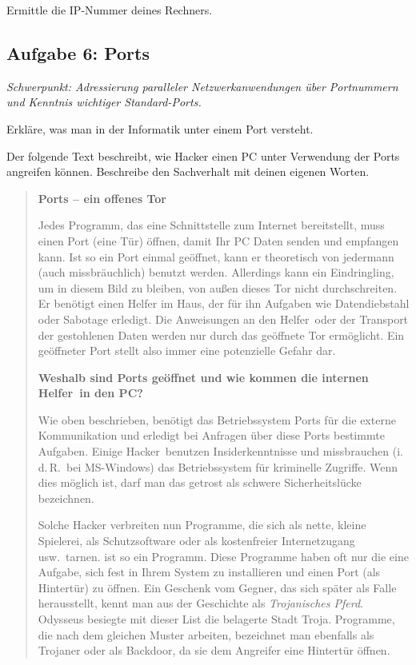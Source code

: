 Ermittle die IP-Nummer deines Rechners. 


\subsection{Aufgabe 6: Ports \tagLK \tagGKWahl}
\noindent \emph{Schwerpunkt: Adressierung paralleler Netzwerkanwendungen über Portnummern und Kenntnis wichtiger Standard-Ports.}

\begin{compactenum}[a)]
\item Erkläre, was man in der Informatik unter einem Port versteht.

\item Der folgende Text beschreibt, wie Hacker einen PC unter Verwendung der
Ports angreifen können. Beschreibe den Sachverhalt mit deinen eigenen Worten.

\begin{quotation}
\noindent \textbf{Ports -- ein offenes Tor}

\noindent
Jedes Programm, das eine Schnittstelle zum Internet bereitstellt, muss einen
Port (eine Tür) öffnen, damit Ihr PC Daten senden und empfangen kann. Ist so
ein Port einmal geöffnet, kann er theoretisch von jedermann (auch
missbräuchlich) benutzt werden. Allerdings kann ein Eindringling, um in diesem
Bild zu bleiben, von außen dieses Tor nicht durchschreiten. Er benötigt einen
\glqq Helfer im Haus\grqq , der für ihn Aufgaben wie Datendiebstahl oder
Sabotage erledigt. Die Anweisungen an den \glqq Helfer\grqq\ oder der Transport
der gestohlenen Daten werden nur durch das geöffnete Tor ermöglicht. Ein
geöffneter Port stellt also immer eine potenzielle Gefahr dar.

\noindent
\textbf{Weshalb sind Ports geöffnet und wie kommen die internen \glqq
Helfer\grqq\ in den PC?}

\noindent
Wie oben beschrieben, benötigt das Betriebssystem Ports für die externe
Kommunikation und erledigt bei Anfragen über diese Ports bestimmte Aufgaben.
Einige \glqq Hacker\grqq\ benutzen Insiderkenntnisse und missbrauchen (i.\,d.\,R.\
bei MS-Windows) das Betriebssystem für kriminelle Zugriffe. Wenn dies möglich
ist, darf man das getrost als schwere Sicherheitslücke bezeichnen.

\noindent
Solche Hacker verbreiten nun Programme, die sich als nette, kleine Spielerei,
als Schutzsoftware oder als kostenfreier Internetzugang usw.\ tarnen.
\myFile{AOL4FREE.EXE} ist so ein Programm. Diese Programme haben oft nur die
eine Aufgabe, sich fest in Ihrem System zu installieren und einen Port (als
Hintertür) zu öffnen. Ein Geschenk vom Gegner, das sich später als Falle
herausstellt, kennt man aus der Geschichte als \emph{Trojanisches Pferd}.
Odysseus besiegte mit dieser List die belagerte Stadt Troja. Programme, die
nach dem gleichen Muster arbeiten, bezeichnet man ebenfalls als Trojaner oder
als \glqq Backdoor\grqq , da sie dem Angreifer eine Hintertür öffnen.


\end{quotation}
\end{compactenum}
